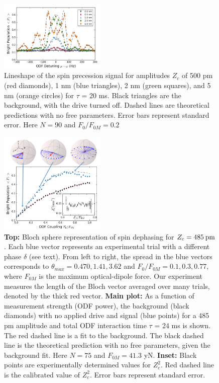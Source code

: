 \documentclass[aps,prl,twocolumn,superscriptaddress,floatfix]{revtex4-1}
\begin{document}
\begin{figure}
    \centering
    \includegraphics[width=0.45\textwidth]{lineshape}
  \caption{Lineshape of the spin precession signal for amplitudes $Z_c$ of 500 pm (red diamonds), 1 nm (blue triangles), 2 nm (green squares), and 5 nm (orange circles) for $\tau$ = 20 ms. Black triangles are the background, with the drive turned off. Dashed lines are theoretical predictions with no free parameters. Error bars represent standard error. Here $N = 90$ and $F_{0}/F_{0M} = 0.2$}\label{lineshape}
\end{figure}
\begin{figure}
    \centering
    \includegraphics[width=0.45\textwidth]{measurement_strength_inset_z2_485}
  \caption{\textbf{Top:} Bloch sphere representation of spin dephasing for $Z_{c} = 485\: \rm{pm}$. Each blue vector represents an experimental trial with a different phase $\delta$ (see text). From left to right, the spread in the blue vectors corresponds to $\theta_{max} = 0.470, 1.41, 3.62$ and $F_{0}/F_{0M} = 0.1,0.3,0.77$, where $F_{0M}$ is the maximum optical-dipole force. Our experiment measures the length of the Bloch vector averaged over many trials, denoted by the thick red vector. \textbf{Main plot:} As a function of measurement strength (ODF power), the background (black diamonds) with no applied drive and signal (blue points) for a 485 pm amplitude and total ODF interaction time $\tau$ = 24 ms is shown. The red dashed line is a fit to the background. The black dashed line is the theoretical prediction with no free parameters, given the background fit. Here $N = 75$ and $F_{0M} = 41.3$ yN. \textbf{Inset:} Black points are experimentally determined values for $Z_{c}^2$. Red dashed line is the calibrated value of $Z_{c}^{2}$. Error bars represent standard error.}\label{Meas_stren}
\end{figure}
\end{document}
